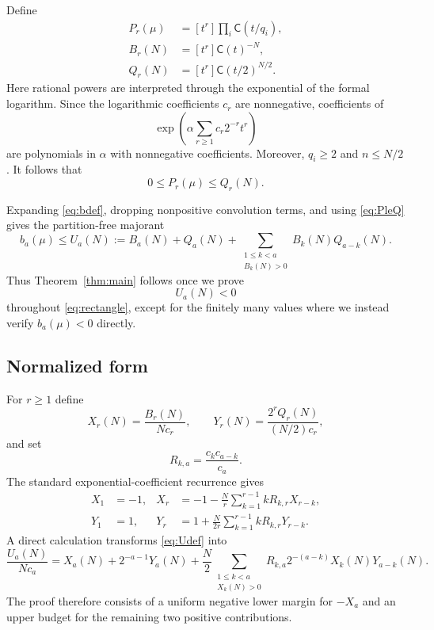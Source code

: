 \documentclass[11pt]{article}
\theoremstyle{definition}
\theoremstyle{remark}
\newcommand{\C}{\mathsf C}
\begin{document}
Define
\begin{equation}\label{eq:PBQ}
\begin{split}
 P_r(\mu)&=[t^r]\prod_i\C(t/q_i),\\
 B_r(N)&=[t^r]\C(t)^{-N},\\
 Q_r(N)&=[t^r]\C(t/2)^{N/2}.
\end{split}
\end{equation}
Here rational powers are interpreted through the exponential of the formal
logarithm.  Since the logarithmic coefficients $c_r$ are nonnegative,
coefficients of
\[
  \exp\left(\alpha\sum_{r\ge1}c_r2^{-r}t^r\right)
\]
are polynomials in $\alpha$ with nonnegative coefficients.  Moreover,
$q_i\ge2$ and $n\le N/2$.  It follows that
\begin{equation}\label{eq:PleQ}
  0\le P_r(\mu)\le Q_r(N).
\end{equation}

Expanding \eqref{eq:bdef}, dropping nonpositive convolution terms, and using
\eqref{eq:PleQ} gives the partition-free majorant
\begin{equation}\label{eq:Udef}
 b_a(\mu)\le U_a(N):=B_a(N)+Q_a(N)+
   \sum_{\substack{1\le k<a\\B_k(N)>0}}B_k(N)Q_{a-k}(N).
\end{equation}
Thus Theorem~\ref{thm:main} follows once we prove
\begin{equation}\label{eq:Uneg}
  U_a(N)<0
\end{equation}
throughout \eqref{eq:rectangle}, except for the finitely many values where we
instead verify $b_a(\mu)<0$ directly.

\subsection{Normalized form}

For $r\ge1$ define
\begin{equation}\label{eq:XY}
  X_r(N)=\frac{B_r(N)}{Nc_r},
  \qquad
  Y_r(N)=\frac{2^rQ_r(N)}{(N/2)c_r},
\end{equation}
and set
\begin{equation}\label{eq:R}
  R_{k,a}=\frac{c_kc_{a-k}}{c_a}.
\end{equation}
The standard exponential-coefficient recurrence gives
\begin{align}
  X_1&=-1,&
  X_r&=-1-\frac Nr\sum_{k=1}^{r-1}kR_{k,r}X_{r-k},
  \label{eq:Xrec}\\
  Y_1&=1,&
  Y_r&=1+\frac N{2r}\sum_{k=1}^{r-1}kR_{k,r}Y_{r-k}.
  \label{eq:Yrec}
\end{align}
A direct calculation transforms \eqref{eq:Udef} into
\begin{equation}\label{eq:Unorm}
 \frac{U_a(N)}{Nc_a}
  =X_a(N)+2^{-a-1}Y_a(N)
   +\frac N2\sum_{\substack{1\le k<a\\X_k(N)>0}}
      R_{k,a}2^{-(a-k)}X_k(N)Y_{a-k}(N).
\end{equation}
The proof therefore consists of a uniform negative lower margin for $-X_a$
and an upper budget for the remaining two positive contributions.
\end{document}
